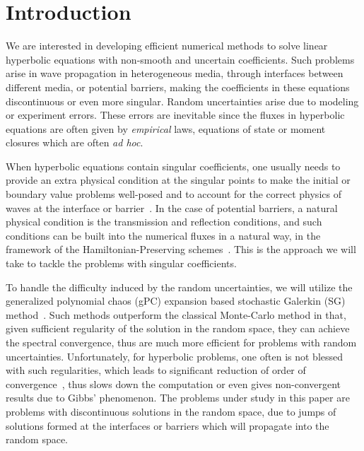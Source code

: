 \documentclass[12pt]{article}
\theoremstyle{plain}
\theoremstyle{remark}
\theoremstyle{remark}
\theoremstyle{remark}
\numberwithin{equation}{section}
\begin{document}
\section{Introduction}\label{intro}
We are interested in developing efficient numerical methods to solve
linear hyperbolic equations with non-smooth and uncertain coefficients. Such problems arise in wave propagation in heterogeneous media, through interfaces between different media, or potential barriers,  making the coefficients in
these equations discontinuous or even more singular. Random uncertainties arise
due to modeling or experiment errors. These errors are inevitable since the
fluxes in  hyperbolic equations are often given by {\it empirical} laws, equations of state or
moment closures which are often {\it ad hoc}.

When hyperbolic equations contain singular coefficients, one usually needs to
provide an extra physical condition at the singular points to make the 
initial or boundary value problems well-posed and to account for 
the correct physics of waves at the interface or barrier~\cite{Wen:2005ueba, Jin:2009pro}.
In the case of potential barriers, a natural physical condition is the transmission
and reflection conditions,  and such conditions
can be built into the numerical fluxes in a natural way, in the framework of
the Hamiltonian-Preserving schemes~\cite{Wen:2005ueba, JinWen-wave}. 
This is the approach we will take to tackle the problems with singular coefficients.

To handle the difficulty induced by the random uncertainties, we will utilize the generalized
polynomial chaos (gPC) expansion based stochastic Galerkin (SG) method~\cite{Bijl:2013hkba, GS, GWZ, LMK, PIN, Tryoen:2010djba, Xiu:2010wxba, XiuKar}.
Such methods outperform the classical Monte-Carlo method in that, given
sufficient regularity of the solution in the random space, they can achieve
the spectral convergence, thus are  much more efficient  for
problems with random uncertainties. Unfortunately, for hyperbolic problems,
one often is not blessed with such regularities, which leads to 
significant reduction of order of
convergence~\cite{Motamed:2012gsba, Tang:2012ibba},
 thus slows down the computation or even gives 
non-convergent results due to Gibbs' phenomenon.  The problems under study in this paper are  problems with discontinuous solutions in the random space, due to jumps of solutions formed at the interfaces or barriers which will propagate
into the random space.
\end{document}
